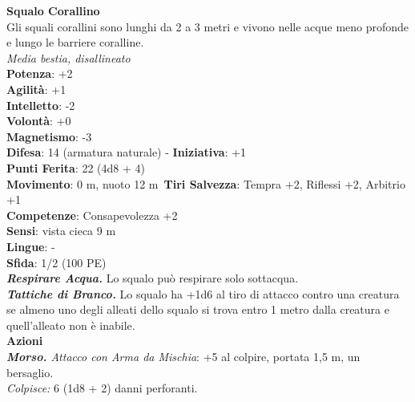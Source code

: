 \begin{multicols}{2}
\medskip\textbf{Squalo Corallino}\\
Gli squali corallini sono lunghi da 2 a 3 metri e vivono  nelle acque meno profonde e lungo le barriere coralline.\\
\emph{Media bestia, disallineato}\\
\textbf{Potenza}: +2\\
\textbf{Agilità}: +1\\
\textbf{Intelletto}: -2\\
\textbf{Volontà}: +0\\
\textbf{Magnetismo}: -3\\
\textbf{Difesa}: 14 (armatura naturale) - \textbf{Iniziativa}: +1\\
\textbf{Punti Ferita}: 22 (4d8 + 4)\\
\textbf{Movimento}: 0 m, nuoto 12 m\
\textbf{Tiri Salvezza}: Tempra +2, Riflessi +2, Arbitrio +1\\
\textbf{Competenze}: Consapevolezza +2\\
\textbf{Sensi}: vista cieca 9 m\\
\textbf{Lingue}: -\\
\textbf{Sfida}: 1/2 (100 PE)\smallskip\\
\emph{\textbf{Respirare Acqua.}} Lo squalo può respirare solo sottacqua.\\
\emph{\textbf{Tattiche di Branco.}} Lo squalo ha +1d6 al tiro di attacco contro una creatura se almeno uno degli alleati dello squalo si  trova entro 1 metro dalla creatura e quell'alleato non è inabile.\\
\smallskip\textbf{Azioni}\\
\emph{\textbf{Morso.} Attacco con Arma da Mischia}: +5 al colpire, portata 1,5 m, un bersaglio.\\
\emph{Colpisce:} 6 (1d8 + 2) danni perforanti.\\


\end{multicols}
